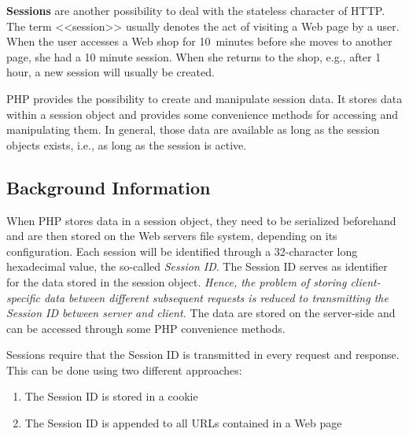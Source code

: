 \documentclass[a4paper, justified, notoc]{tufte-handout} %
\begin{document}
\textbf{Sessions} are another possibility to deal with the stateless character of HTTP. The term <<session>> usually denotes the act of visiting a Web page by a user. %
When the user accesses a Web shop for 10~minutes before she moves to another page, she had a 10 minute session. When she returns to the shop, e.g., after 1 hour, a new session will usually be created.  

PHP provides the possibility to create and manipulate session data. It stores data within a session object and provides some convenience methods for accessing and manipulating them.
In general, those data are available as long as the session objects exists, i.e., as long as the session is active. 


\subsection{Background Information} %
\label{sub:background_information}

When PHP stores data in a session object, they need to be serialized beforehand and are then stored on the Web servers file system, depending on its configuration. 
Each  session will be identified through a 32-character long hexadecimal value, the so-called \emph{Session ID}.
The Session ID serves as identifier for the data stored in the session object. 
\emph{Hence, the problem of storing client-specific data between different subsequent requests is reduced to transmitting the Session ID between server and client. }
The data are stored on the server-side and can be accessed through some PHP convenience methods. 

Sessions require that the Session ID is transmitted in every request and response.
This can be done using two different approaches:
\begin{enumerate}
	\item The Session ID is stored in a cookie
	\item The Session ID is appended to all URLs contained in a Web page
\end{enumerate}
\end{document}

